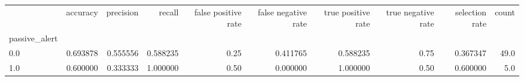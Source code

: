 \begin{tabular}{lrrrrrrrrr}
\toprule
{} &  accuracy &  precision &    recall &  false positive rate &  false negative rate &  true positive rate &  true negative rate &  selection rate &  count \\
passive\_alert &           &            &           &                      &                      &                     &                     &                 &        \\
\midrule
0.0           &  0.693878 &   0.555556 &  0.588235 &                 0.25 &             0.411765 &            0.588235 &                0.75 &        0.367347 &   49.0 \\
1.0           &  0.600000 &   0.333333 &  1.000000 &                 0.50 &             0.000000 &            1.000000 &                0.50 &        0.600000 &    5.0 \\
\bottomrule
\end{tabular}
